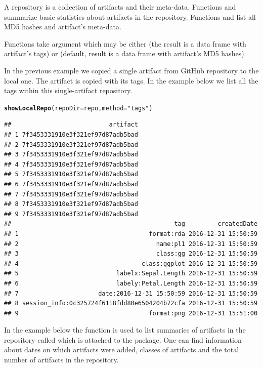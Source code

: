 \documentclass[nojss]{jss}\usepackage[]{graphicx}\usepackage[]{color}
\makeatletter
\newcommand{\hlstr}[1]{\textcolor[rgb]{0.192,0.494,0.8}{#1}}%
\newcommand{\hlstd}[1]{\textcolor[rgb]{0.345,0.345,0.345}{#1}}%
\newcommand{\hlkwc}[1]{\textcolor[rgb]{0.333,0.667,0.333}{#1}}%
\newcommand{\hlkwd}[1]{\textcolor[rgb]{0.737,0.353,0.396}{\textbf{#1}}}%
\newenvironment{kframe}{%
 \def\at@end@of@kframe{}%
 \ifinner\ifhmode%
  \def\at@end@of@kframe{\end{minipage}}%
  \begin{minipage}{\columnwidth}%
 \fi\fi%
 \def\FrameCommand##1{\hskip\@totalleftmargin \hskip-\fboxsep
 \colorbox{shadecolor}{##1}\hskip-\fboxsep
     \hskip-\linewidth \hskip-\@totalleftmargin \hskip\columnwidth}%
 \MakeFramed {\advance\hsize-\width
   \@totalleftmargin\z@ \linewidth\hsize
   \@setminipage}}%
 {\par\unskip\endMakeFramed%
 \at@end@of@kframe}
\newenvironment{knitrout}{}{} %
\makeatother
\begin{document}
A repository is a collection of artifacts and their meta-data. Functions  and  summarize basic statistics about artifacts in the repository. Functions  and  list all MD5 hashes and artifact’s meta-data. 

Functions  take argument  which may be either  (the result is a data frame with artifact’s tags) or  (default, result is a data frame with artifact’s MD5 hashes). 

In the previous example we copied a single artifact from GitHub repository to the local one. The artifact is copied with its tags. In the example below we list all the tags within this single-artifact repository.

\begin{knitrout}
\color{fgcolor}\begin{kframe}
\begin{alltt}
\hlkwd{showLocalRepo}\hlstd{(}\hlkwc{repoDir} \hlstd{= repo,} \hlkwc{method} \hlstd{=} \hlstr{"tags"}\hlstd{)}
\end{alltt}
\begin{verbatim}
##                           artifact
## 1 7f3453331910e3f321ef97d87adb5bad
## 2 7f3453331910e3f321ef97d87adb5bad
## 3 7f3453331910e3f321ef97d87adb5bad
## 4 7f3453331910e3f321ef97d87adb5bad
## 5 7f3453331910e3f321ef97d87adb5bad
## 6 7f3453331910e3f321ef97d87adb5bad
## 7 7f3453331910e3f321ef97d87adb5bad
## 8 7f3453331910e3f321ef97d87adb5bad
## 9 7f3453331910e3f321ef97d87adb5bad
##                                             tag         createdDate
## 1                                    format:rda 2016-12-31 15:50:59
## 2                                      name:pl1 2016-12-31 15:50:59
## 3                                      class:gg 2016-12-31 15:50:59
## 4                                  class:ggplot 2016-12-31 15:50:59
## 5                           labelx:Sepal.Length 2016-12-31 15:50:59
## 6                           labely:Petal.Length 2016-12-31 15:50:59
## 7                      date:2016-12-31 15:50:59 2016-12-31 15:50:59
## 8 session_info:0c325724f6118fdd80e6504204b72cfa 2016-12-31 15:50:59
## 9                                    format:png 2016-12-31 15:51:00
\end{verbatim}
\end{kframe}
\end{knitrout}

In the example below the function  is used to list summaries of artifacts in the repository called  which is attached to the  package. One can find information about dates on which artifacts were added, classes of artifacts and the total number of artifacts in the repository.
\end{document}

